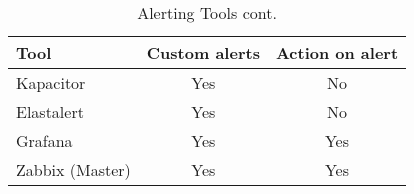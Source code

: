 \begin{table}[]
	\centering
	\caption{Alerting Tools cont.}
	\label{my-label}
	\begin{tabular}{lcc}
		\hline
		Tool & Custom alerts & Action on alert \\
		\hline
		Kapacitor                    & Yes           & No              \\
		Elastalert                   & Yes           & No              \\
		Grafana                      & Yes           & Yes             \\
		Zabbix (Master)              & Yes           & Yes           \\
		\hline 
	\end{tabular}
\end{table}